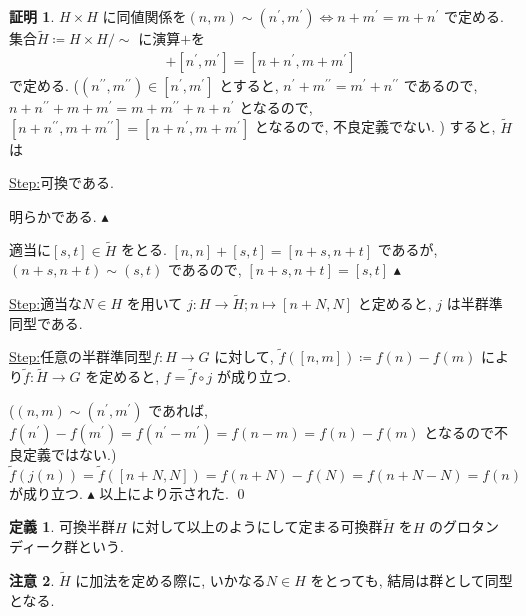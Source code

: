 \documentclass[10pt, fleqn, label-section=none]{bxjsarticle}
\theoremstyle{definition}
\newtheorem{dfn}{定義}[section]
\newtheorem*{pf*}{証明}
\newtheorem{remark}[dfn]{注意}
\newcommand{\LR}{\Leftrightarrow}
\renewcommand{\;}{\, ; \,}
\newenvironment{claim}[1]{\par\noindent\underline{Step:}\space#1}{}
\newenvironment{claimproof}[1]{\par\noindent{($\because$)}\space#1}{\hfill $\blacktriangle $}
\newcommand{\pprime}{{\prime \prime}}
\begin{document}
\begin{pf*}
$H\times H$ に同値関係を$(n,m) \sim (n^\prime , m^\prime) \LR n + m^\prime = m + n^\prime $ で定める.  集合$\tilde H \coloneqq H \times H / \sim$ に演算$+$を
\begin{align*} [n,m] + [n^\prime , m^\prime ] = [n + n^\prime, m + m^\prime ]\end{align*}
で定める. ($(n^\pprime , m^\pprime  ) \in [n^\prime , m^\prime ]$ とすると, $n^\prime + m^\pprime = m^\prime + n^\pprime $ であるので, $n + n^\pprime + m + m^\prime = m + m^\pprime + n + n^\prime $ となるので, $[n + n^\pprime , m + m^\pprime ] = [n + n^\prime , m + m^\prime ]$ となるので, 不良定義でない. ) すると, $\tilde H $ は
\begin{claim}
可換である.
\end{claim}
\begin{claimproof}
明らかである.
\end{claimproof}

\begin{claimproof}
適当に$[s,t] \in \tilde H$ をとる. $[n, n] + [ s, t] = [n + s, n + t] $ であるが, $(n +s, n+t) \sim (s, t) $ であるので, $[n +s, n+t] = [s, t] $
\end{claimproof}


\begin{claim}適当な$N \in H$ を用いて
$j : H \rightarrow \tilde H ; n \mapsto [n + N, N] $ と定めると, $j$ は半群準同型である. 
\end{claim}

\begin{claim}
任意の半群準同型$f: H \rightarrow G$ に対して, $\tilde f ([n,m]) \coloneqq f(n) - f(m)$ により$\tilde f : \tilde H \rightarrow G$ を定めると, $f = \tilde f \circ j$ が成り立つ. 
\end{claim}
\begin{claimproof}
($(n,m) \sim (n^\prime, m^\prime )$ であれば, $f(n^\prime) - f(m^\prime ) = f(n^\prime - m^\prime ) = f( n - m) = f(n) - f(m)$ となるので不良定義ではない.) $\tilde f (j(n)) = \tilde f ([n +N, N]) = f(n + N) - f(N) = f(n + N - N) =  f(n)$ が成り立つ. 
\end{claimproof}
以上により示された.
\qed
\end{pf*}

\begin{dfn}
可換半群$H$ に対して以上のようにして定まる可換群$\tilde H$ を$H$ のグロタンディーク群という. 
\end{dfn}

\begin{remark}
$\tilde H$ に加法を定める際に, いかなる$N \in H$ をとっても, 結局は群として同型となる. 
\end{remark}
\end{document}
